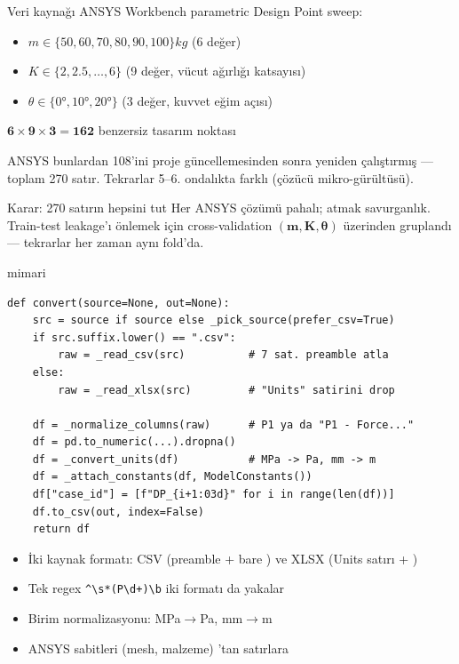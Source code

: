 \begin{frame}{Veri kaynağı}
  ANSYS Workbench parametric Design Point sweep:
  \begin{itemize}
    \item \(m \in \{50, 60, 70, 80, 90, 100\}\unit{kg}\) (6 değer)
    \item \(K \in \{2, 2.5, \ldots, 6\}\) (9 değer, vücut ağırlığı katsayısı)
    \item \(\theta \in \{0°, 10°, 20°\}\) (3 değer, kuvvet eğim açısı)
  \end{itemize}
  \vspace{0.3cm}
  \begin{center}
    \(\boldsymbol{6 \times 9 \times 3 = 162}\) benzersiz tasarım noktası
  \end{center}
  \vspace{0.3cm}
  ANSYS bunlardan 108'ini proje güncellemesinden sonra yeniden çalıştırmış
  --- toplam 270 satır. Tekrarlar 5--6. ondalıkta farklı (çözücü
  mikro-gürültüsü).

  \vspace{0.3cm}
  \begin{block}{Karar: 270 satırın hepsini tut}
    \footnotesize
    Her ANSYS çözümü pahalı; atmak savurganlık. Train-test leakage'ı
    önlemek için cross-validation \alert{\(\boldsymbol{(m, K, \theta)}\)
    üzerinden gruplandı} --- tekrarlar her zaman aynı fold'da.
  \end{block}
\end{frame}

\begin{frame}[fragile]{ mimari}
\begin{lstlisting}
def convert(source=None, out=None):
    src = source if source else _pick_source(prefer_csv=True)
    if src.suffix.lower() == ".csv":
        raw = _read_csv(src)          # 7 sat. preamble atla
    else:
        raw = _read_xlsx(src)         # "Units" satirini drop

    df = _normalize_columns(raw)      # P1 ya da "P1 - Force..."
    df = pd.to_numeric(...).dropna()
    df = _convert_units(df)           # MPa -> Pa, mm -> m
    df = _attach_constants(df, ModelConstants())
    df["case_id"] = [f"DP_{i+1:03d}" for i in range(len(df))]
    df.to_csv(out, index=False)
    return df
\end{lstlisting}

  \begin{itemize}\small
    \item İki kaynak formatı: CSV (preamble + bare ) ve XLSX
          (Units satırı + )
    \item Tek regex \verb|^\s*(P\d+)\b| iki formatı da yakalar
    \item Birim normalizasyonu: MPa\(\to\)Pa, mm\(\to\)m
    \item ANSYS sabitleri (mesh, malzeme) 'tan satırlara
  \end{itemize}
\end{frame}

